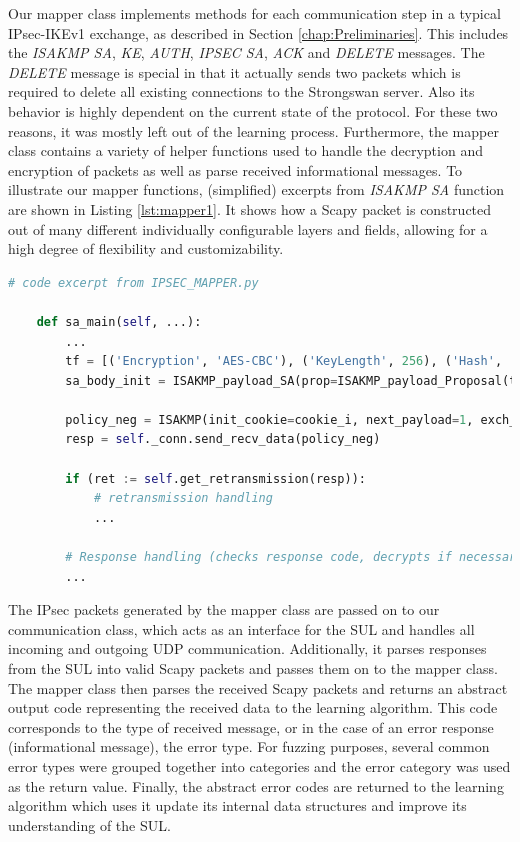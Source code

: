 Our mapper class implements methods for each communication step in a typical IPsec-IKEv1 exchange, as described in Section \ref{chap:Preliminaries}. This includes the \emph{ISAKMP SA}, \emph{KE}, \emph{AUTH}, \emph{IPSEC SA}, \emph{ACK} and \emph{DELETE} messages. The \emph{DELETE} message is special in that it actually sends two packets which is required to delete all existing connections to the Strongswan server. Also its behavior is highly dependent on the current state of the protocol. For these two reasons, it was mostly left out of the learning process. Furthermore, the mapper class contains a variety of helper functions used to handle the decryption and encryption of packets as well as parse received informational messages. To illustrate our mapper functions, (simplified) excerpts from \emph{ISAKMP SA} function are shown in Listing \ref{lst:mapper1}. It shows how a Scapy packet is constructed out of many different individually configurable layers and fields, allowing for a high degree of flexibility and customizability.

\begin{lstlisting}[float=h, caption=Excerpt of SA Main Mapper code, label=lst:mapper1, numbers=none, language=python]
	# code excerpt from IPSEC_MAPPER.py
	
	def sa_main(self, ...):
		...
		tf = [('Encryption', 'AES-CBC'), ('KeyLength', 256), ('Hash', 'SHA'), ('GroupDesc', '1024MODPgr'), ('Authentication', 'PSK'), ('LifeDuration', 28800)]
		sa_body_init = ISAKMP_payload_SA(prop=ISAKMP_payload_Proposal(trans_nb=1, trans=ISAKMP_payload_Transform(num=1, transforms=tf)))
		
		policy_neg = ISAKMP(init_cookie=cookie_i, next_payload=1, exch_type=2)/sa_body_init
		resp = self._conn.send_recv_data(policy_neg)
		
		if (ret := self.get_retransmission(resp)): 
			# retransmission handling
			...
		
		# Response handling (checks response code, decrypts if necessary, updates relevant local values)
		...
\end{lstlisting}

The IPsec packets generated by the mapper class are passed on to our communication class, which acts as an interface for the SUL and handles all incoming and outgoing UDP communication. Additionally, it parses responses from the SUL into valid Scapy packets and passes them on to the mapper class. The mapper class then parses the received Scapy packets and returns an abstract output code representing the received data to the learning algorithm. This code corresponds to the type of received message, or in the case of an error response (informational message), the error type. For fuzzing purposes, several common error types were grouped together into categories and the error category was used as the return value. Finally, the abstract error codes are returned to the learning algorithm which uses it update its internal data structures and improve its understanding of the SUL. \\


